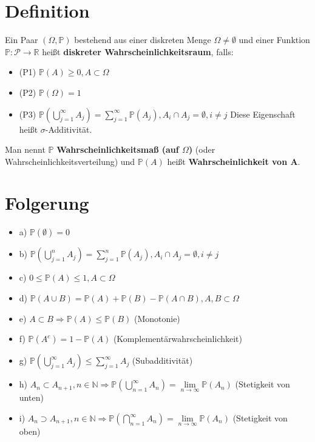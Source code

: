 \documentclass[a4paper,11pt,notitlepage]{report}
\newcommand{\R}{{\ensuremath{\mathbb{R}}}}
\newcommand{\N}{{\ensuremath{\mathbb{N}}}}
\newcommand{\Prim}{{\ensuremath{\mathbb{P}}}}
\begin{document}
\section{Definition}
	Ein Paar $(\Omega, \mathbb{P})$ bestehend aus einer diskreten Menge $\Omega \neq \emptyset$ und einer Funktion $\mathbb{P} \colon \mathcal{P} \rightarrow \R$ heißt \textbf{diskreter Wahrscheinlichkeitsraum}, falls:
	\begin{itemize}
		\item (P1) $\mathbb{P}(A) \geq 0, A \subset \Omega$
		\item (P2) $\mathbb{P}(\Omega) = 1$
		\item (P3) $\mathbb{P}(\bigcup\limits_{j = 1}^{\infty}{A_j}) = \sum\limits_{j=1}^{\infty}{\mathbb{P}(A_j)}, A_i \cap A_j = \emptyset, i \neq j$
		\newline
		Diese Eigenschaft heißt $\sigma$-Additivität.
	\end{itemize}
	Man nennt $\mathbb{P}$ \textbf{Wahrscheinlichkeitsmaß (auf $\Omega$)} (oder Wahrscheinlichkeitsverteilung) und $\mathbb{P}(A)$ heißt \textbf{Wahrscheinlichkeit von A}.
	
\section{Folgerung}
\begin{itemize}
	\item a) $\Prim(\emptyset) = 0$
	\item b) $\Prim(\bigcup\limits_{j=1}^{n}{A_j}) = \sum \limits_{j=1}^{n}{\Prim(A_j)}, A_i \cap A_j = \emptyset, i \neq j$
	\item c) $0 \leq \Prim(A) \leq 1, A \subset \Omega$
	\item d) $\Prim(A \cup B) = \Prim(A) + \Prim(B) - \Prim(A \cap B), A,B \subset \Omega$
	\item e) $A \subset B \Rightarrow \Prim(A) \leq \Prim(B)$ (Monotonie)
	\item f) $\Prim(A^c) = 1 - \Prim(A)$ (Komplementärwahrscheinlichkeit)
	\item g) $\Prim(\bigcup\limits_{j=1}^{\infty}{A_j}) \leq \sum \limits_{j=1}^{\infty}{A_j}$ (Subadditivität)
	\item h) $A_n \subset A_{n+1}, n \in \N \Rightarrow \Prim(\bigcup\limits_{n=1}^{\infty}{A_n}) = \lim \limits_{n \rightarrow \infty}{\Prim(A_n)}$ (Stetigkeit von unten)
	\item i) $A_n \supset A_{n+1}, n \in \N \Rightarrow \Prim(\bigcap\limits_{n=1}^{\infty}{A_n}) = \lim \limits_{n \rightarrow \infty}{\Prim(A_n)}$ (Stetigkeit von oben)
\end{itemize}
\end{document}
